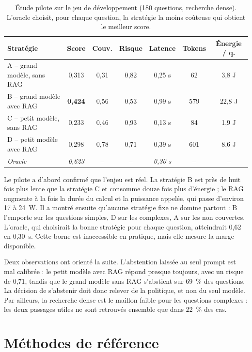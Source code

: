 \documentclass[11pt,a4paper]{article}
\begin{document}
\begin{table}[H]
\centering\small
\begin{tabular}{l c c c c c c}
\toprule
\textbf{Stratégie} & \textbf{Score} & \textbf{Couv.} & \textbf{Risque} & \textbf{Latence} & \textbf{Tokens} & \textbf{Énergie / q.} \\
\midrule
A -- grand modèle, sans RAG & 0,313 & 0,31 & 0,82 & 0,25 s & 62 & 3,8 J \\
B -- grand modèle avec RAG  & \textbf{0,424} & 0,56 & 0,53 & 0,99 s & 579 & 22,8 J \\
C -- petit modèle, sans RAG & 0,233 & 0,46 & 0,93 & 0,13 s & 84 & 1,9 J \\
D -- petit modèle avec RAG  & 0,298 & 0,78 & 0,71 & 0,39 s & 601 & 8,6 J \\
\midrule
\textit{Oracle} & \textit{0,623} & -- & -- & \textit{0,30 s} & -- & -- \\
\bottomrule
\end{tabular}
\caption{Étude pilote sur le jeu de développement (180 questions, recherche dense). L'oracle choisit,
pour chaque question, la stratégie la moins coûteuse qui obtient le meilleur score.}
\label{tab:pilote}
\end{table}

Le pilote a d'abord confirmé que l'enjeu est réel. La stratégie B est près de huit fois plus lente que
la stratégie C et consomme douze fois plus d'énergie ; le RAG augmente à la fois la durée du calcul et
la puissance appelée, qui passe d'environ 17 à 24~W. Il a montré ensuite qu'aucune stratégie fixe ne
domine partout : B l'emporte sur les questions simples, D sur les complexes, A sur les non couvertes.
L'oracle, qui choisirait la bonne stratégie pour chaque question, atteindrait 0,62 en 0,30~s. Cette
borne est inaccessible en pratique, mais elle mesure la marge disponible.

Deux observations ont orienté la suite. L'abstention laissée au seul prompt est mal calibrée : le petit
modèle avec RAG répond presque toujours, avec un risque de 0,71, tandis que le grand modèle sans RAG
s'abstient sur 69~\% des questions. La décision de s'abstenir doit donc relever de la politique, et non
du seul modèle. Par ailleurs, la recherche dense est le maillon faible pour les questions complexes : les
deux passages utiles ne sont retrouvés ensemble que dans 22~\% des cas.

\section{Méthodes de référence}\label{sec:references}
\end{document}
